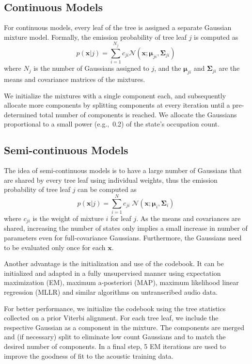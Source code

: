 \documentclass{article}
\def \x{{\mathbf x}}
\def \m{{\bm \mu}}
\def \k{{\mathbf \Sigma}}
\def \nv{{\mathcal N}}
\begin{document}
\subsection{Continuous Models}
For continuous models, every leaf of the tree is assigned a separate
Gaussian mixture model. Formally, the emission probability of tree leaf $j$ is 
computed as
\begin{equation}
p(\x | j) = \sum_{i=1}^{N_j} c_{ji} \nv(\x; \m_{ji}, \k_{ji}) 
\end{equation}
where $N_j$ is the number of Gaussians assigned to $j$, and the $\m_{ji}$ and
$\k_{ji}$ are the means and covariance matrices of the mixtures.

We initialize the mixtures with a single component each, and subsequently 
allocate more components by splitting components at every iteration until a 
pre-determined total number of components is reached. We allocate 
the Gaussians proportional to a small power (e.g.,~0.2) of the state's 
occupation count.

\subsection{Semi-continuous Models}
The idea of semi-continuous models is to have a large number of Gaussians that
are shared by every tree leaf using individual weights, thus the emission 
probability of tree leaf $j$ can be computed as
\begin{equation}
p(\x | j) = \sum_{i=1}^{N} c_{ji} \; \nv(\x; \m_i, \k_i) 
\end{equation}
where $c_{ji}$ is the weight of mixture $i$ for leaf $j$. As the means
and covariances are shared, increasing the number of states only implies
a small increase in number of parameters even for full-covariance Gaussians.
Furthermore, the Gaussians need to be evaluated only once for each $\x$.

Another advantage is the initialization and use of the codebook. It can be
initialized and adapted in a fully unsupervised manner using expectation
maximization (EM), maximum a-posteriori (MAP), maximum likelihood linear
regression (MLLR) and similar algorithms on untranscribed audio data.

For better performance, we initialize the codebook using the tree statistics
collected on a prior Viterbi alignment. For each tree leaf, we include
the respective Gaussian as a component in the mixture.
The components are merged and (if necessary) split to eliminate low count 
Gaussians and to match the desired number of components. In a final step, 
5 EM iterations are used to improve the goodness of fit to the acoustic 
training data.
\end{document}
